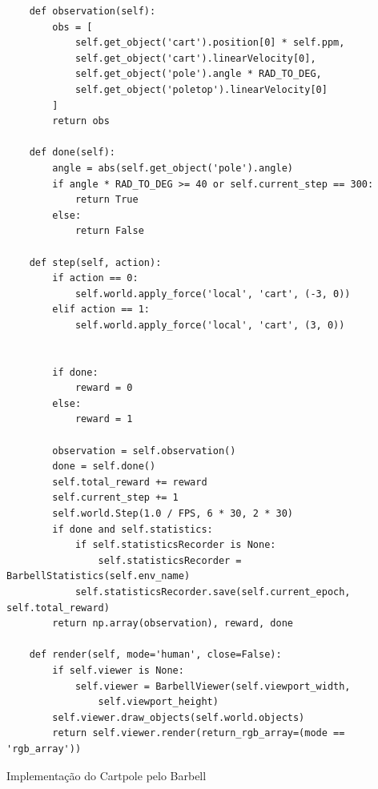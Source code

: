 \documentclass[cic,tc]{iiufrgs}
\newenvironment{longlisting}{\captionsetup{type=listing}}{}
\begin{document}
\begin{longlisting}
\begin{verbatim}
    def observation(self):
        obs = [
            self.get_object('cart').position[0] * self.ppm,
            self.get_object('cart').linearVelocity[0],
            self.get_object('pole').angle * RAD_TO_DEG,
            self.get_object('poletop').linearVelocity[0]
        ]
        return obs

    def done(self):
        angle = abs(self.get_object('pole').angle)
        if angle * RAD_TO_DEG >= 40 or self.current_step == 300:
            return True
        else:
            return False

    def step(self, action):
        if action == 0:
            self.world.apply_force('local', 'cart', (-3, 0))
        elif action == 1:
            self.world.apply_force('local', 'cart', (3, 0))


        if done:
            reward = 0
        else:
            reward = 1

        observation = self.observation()
        done = self.done()
        self.total_reward += reward
        self.current_step += 1
        self.world.Step(1.0 / FPS, 6 * 30, 2 * 30)
        if done and self.statistics:
            if self.statisticsRecorder is None:
                self.statisticsRecorder = BarbellStatistics(self.env_name)
            self.statisticsRecorder.save(self.current_epoch, self.total_reward)
        return np.array(observation), reward, done

    def render(self, mode='human', close=False):
        if self.viewer is None:
            self.viewer = BarbellViewer(self.viewport_width,
                self.viewport_height)
        self.viewer.draw_objects(self.world.objects)
        return self.viewer.render(return_rgb_array=(mode == 'rgb_array'))

\end{verbatim}
\caption[Cópia de DNA]{Implementação do Cartpole pelo Barbell}
\label{source:cartpole_python}
\end{longlisting}

\end{document}
